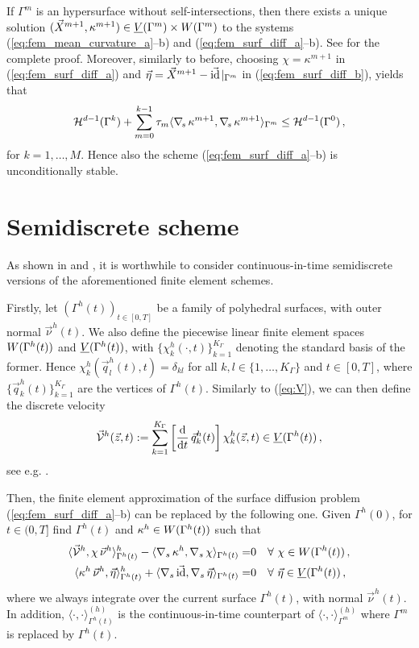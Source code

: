 If $\Gamma^m$ is an hypersurface without self-intersections, then there exists
a unique solution $(\vec X^{m+1}, \kappa^{m+1}) \in \underline{V}(\Gamma^m) \times W(\Gamma^m)$ to the
systems (\ref{eq:fem_mean_curvature_a}--b) and (\ref{eq:fem_surf_diff_a}--b).
See \cite[Theorem~2.1]{gflows3d} for the complete proof. Moreover, similarly to
before, choosing $\chi=\kappa^{m+1}$ in (\ref{eq:fem_surf_diff_a}) and
$\vec \eta=\vec X^{m+1} - \vec{\rm id}\!\mid_{\Gamma^m}$ in
(\ref{eq:fem_surf_diff_b}), yields that
\begin{equation*}
\mathcal{H}^{d-1}(\Gamma^k)+\sum_{m=0}^{k-1}\tau_m
\langle \nabla_{\!s}\,\kappa^{m+1},\nabla_{\!s}\,\kappa^{m+1}\rangle_{\Gamma^m}
\leq \mathcal{H}^{d-1}(\Gamma^0)\,,
\end{equation*}
for ${k=1,\ldots,M}$. Hence also the scheme (\ref{eq:fem_surf_diff_a}--b) is
unconditionally stable.

\section{Semidiscrete scheme}\label{sec:geometric_pdes_semi_fem}
As shown in \cite[Remark~2.3]{triplej} and \cite[\S4]{gflows3d}, it is
worthwhile to consider continuous-in-time semidiscrete versions of the
aforementioned finite element schemes.

Firstly, let $(\Gamma^h(t))_{t\in[0,T]}$ be a family of polyhedral surfaces,
with outer normal $\vec\nu^h(t)$. We also define the piecewise linear finite
element spaces $W(\Gamma^h(t))$ and $\underline{V}(\Gamma^h(t))$, with $\{\chi^h_k(\cdot,t)\}_{k=1}^{K_\Gamma}$
denoting the standard basis of the former. Hence $\chi^h_k(\vec q^h_l(t),t) =
\delta_{kl}$ for all $k,l \in \{1,\ldots,K_\Gamma\}$ and $t \in [0,T]$, where
$\{\vec q^h_k(t)\}_{k=1}^{K_\Gamma}$ are the vertices of $\Gamma^h(t)$.
Similarly to (\ref{eq:V}), we can then define the discrete velocity
\begin{equation}\label{eq:Vsemidisc}
\vec{\mathcal{V}}^h(\vec z, t):=
\sum_{k=1}^{K_\Gamma}\left[\frac{\rm d}{{\rm d}t}\,\vec q^h_k(t)\right] \chi^h_k(\vec z, t)
\in \underline{V}(\Gamma^h(t))\,,
\end{equation}
see e.g. \cite[(3.3)]{tpfs}.

Then, the finite element approximation of the surface diffusion problem
(\ref{eq:fem_surf_diff_a}--b) can be replaced by the following one. Given
$\Gamma^h(0)$, for $t\in (0,T]$ find $\Gamma^h(t)$ and $\kappa^h \in W(\Gamma^h(t))$ such
that
\begin{subequations}
\begin{align}
\langle \vec{\mathcal{V}}^h, \chi \, \vec \nu^h \rangle_{\Gamma^h(t)}^h -
\langle \nabla_s \, \kappa^h , \nabla_s \, \chi \rangle_{\Gamma^h(t)} =& 0
\quad \forall\ \chi \in W(\Gamma^h(t))\,, \label{eq:semidisa} \\
\langle \kappa^h \,\vec \nu^h, \vec \eta \rangle^h_{\Gamma^h(t)} +
\langle \nabla_s \, \vec {\rm id},\nabla_s \, \vec \eta \rangle_{\Gamma^h(t)} =& 0
\quad \forall\ \vec \eta \in \underline{V}(\Gamma^h(t))\,, \label{eq:semidisb}
\end{align}
\end{subequations}
where we always integrate over the current surface $\Gamma^h(t)$, with normal
$\vec \nu^h(t)$. In
addition, $\langle \cdot,\cdot \rangle^{(h)}_{\Gamma^h(t)}$ is the
continuous-in-time counterpart of $\langle\cdot,\cdot\rangle_{\Gamma^m}^{(h)}$
where $\Gamma^m$ is replaced by $\Gamma^h(t)$.

